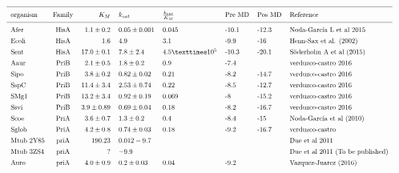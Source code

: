 \documentclass[12pt,twoside]{reedthesis}
\begin{document}
  \[ 
  \resizebox{\columnwidth}{!}{%
  \begin{tabular}{ l c r l l l l l}
  \hline \\ [-1.5ex]
  organism  &Family & $K_M    $     & $k_{cat}$        & $\frac{k_{cat}}{K_M}$ &Pre MD & Pos MD & Reference  \\ [1ex]
  \hline \\ [-1.5ex]
  Afer        &HisA   & $1.1\pm0.2$   &$  0.05\pm0.001    $& 0.045                  &-10.1    &-12.3       &Noda-García L et al 2015\\ [1ex]
  Ecoli       &HisA   &$  1.6         $&$         4.9       $&3.1                   &-9.9   &-16       &Henn-Sax et al. (2002)\\ [1ex]
  Sent        &HisA   &$  17.0 \pm0.1 $&$ 7.8 \pm 2.4   $&$4.5 × 10^5          $&-10.3  &-20.1     &Söderholm A et al (2015)\\ [1ex]
  Aaur        &PriB   &$  2.1 \pm 0.5 $& $    1.8 \pm 0.2     $&0.9                   &-7.4   &              &verduzco-castro 2016\\ [1ex]
  Sipo        &PriB   &$  3.8\pm0.2     $&$0.82\pm0.02        $&0.21                  &-8.2     &-14.7       &verduzco-castro 2016\\ [1ex]
  SspC        &PriB   &$  11.4\pm3.4  $&$2.53\pm0.74      $&0.22                  &   -8.5    &-12.7     &verduzco-castro 2016\\ [1ex]
  SMg1        &PriB   &$  13.2\pm3.4  $&$0.92\pm0.19      $&0.069                 &-8     &-15.2     &verduzco-castro 2016\\ [1ex]
  Ssvi        &PriB   &$  3.9\pm0.89  $&$0.69\pm0.04      $&0.18                  &-8.2     &-16.7     &verduzco-castro 2016\\ [1ex]
  Scoe        &PriA   &$  3.6\pm0.7     $&$ 1.3\pm0.2     $  &0.4                   &-8.4   &-15       &Noda-García et al (2010)\\ [1ex]
  Sglob       &PriA   & $4.2\pm0.8     $ & $0.74\pm0.03    $   &0.18                  &-9.2     &-16.7       &verduzco-castro\\ [1ex]
  Mtub 2Y85   &priA   &$  19  0.23      $&$0.012  -9.7          $&                      &       &          &Due et al 2011\\ [1ex]
  Mtub 3ZS4   &priA   &$  ?                 $&$-9.9               $&                      &       &          &Due et al 2011 (To be published)\\ [1ex]
  Auro        &priA   &$  4.0 \pm 0.9 $&$0.2 \pm 0.03   $&0.04                    &-9.2       &          &Vazquez-Juarez (2016)\\ [1ex]

\end{tabular}}\]
\end{document}
